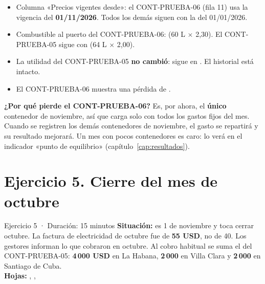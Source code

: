 
\begin{resultado}
\begin{itemize}
  \item Columna «Precios vigentes desde»: el CONT-PRUEBA-06 (fila 11) usa la vigencia del \textbf{01/11/2026}. Todos los demás siguen con la del 01/01/2026.
  \item Combustible al puerto del CONT-PRUEBA-06: \textbf{\vEjCuatroCombSeis} (60 L $\times$ 2,30). El CONT-PRUEBA-05 sigue con \textbf{\vEjCuatroCombCinco}
        (64 L $\times$ 2,00).
  \item La utilidad del CONT-PRUEBA-05 \textbf{no cambió}: sigue en \textbf{\vEjCuatroUAIcinco}. El historial está intacto.
  \item El CONT-PRUEBA-06 muestra una pérdida de \textcolor{red}{\textbf{\vEjCuatroUAIseis}}.
\end{itemize}
\end{resultado}

\begin{nota}
\textbf{¿Por qué pierde el CONT-PRUEBA-06?} Es, por ahora, el \textbf{único} contenedor de noviembre, así que carga solo con todos los gastos
fijos del mes. Cuando se registren los demás contenedores de noviembre, el gasto se repartirá y su resultado mejorará.
Un mes con pocos contenedores es caro: lo verá en el indicador «punto de equilibrio» (capítulo~\ref{cap:resultados}).
\end{nota}

\section{Ejercicio 5. Cierre del mes de octubre}\label{sec:ej5}

\begin{ficha}{Ejercicio 5 · Duración: 15 minutos}
\textbf{Situación:} es 1 de noviembre y toca cerrar octubre. La factura de electricidad de octubre fue de \textbf{55 USD}, no de 40.
Los gestores informan lo que cobraron en octubre. Al cobro habitual se suma el del CONT-PRUEBA-05:
\textbf{4\,000 USD} en La Habana, \textbf{2\,000} en Villa Clara y \textbf{2\,000} en Santiago de Cuba.\\
\textbf{Hojas:} , , 
\end{ficha}

